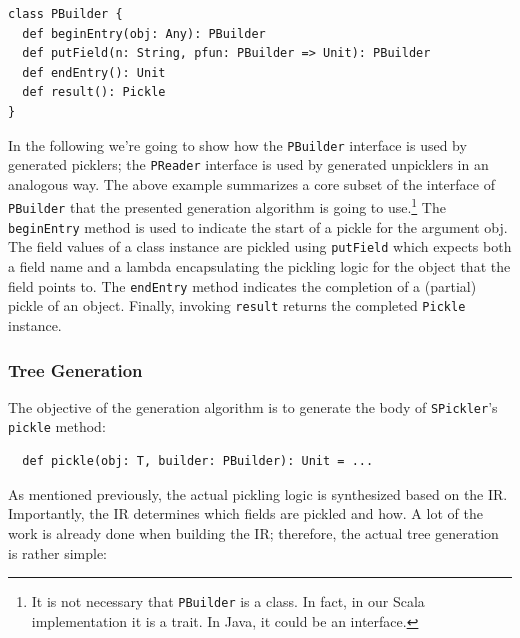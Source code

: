 \documentclass[10pt]{sigplanconf}
\theoremstyle{definition}
\theoremstyle{definition}
\newcommand{\term}[1]{\mbox{\texttt{#1}}}
\begin{document}
\begin{lstlisting}
class PBuilder {
  def beginEntry(obj: Any): PBuilder
  def putField(n: String, pfun: PBuilder => Unit): PBuilder
  def endEntry(): Unit
  def result(): Pickle
}
\end{lstlisting}

In the following we're going to show how the \verb|PBuilder| interface is used
by generated picklers; the \verb|PReader| interface is used by generated
unpicklers in an analogous way. The above example summarizes a core
subset of the interface of \verb|PBuilder| that the presented generation
algorithm is going to use.\footnote{It is not necessary that \texttt{PBuilder}
is a class. In fact, in our Scala implementation it is a trait. In Java, it
could be an interface.} The \verb|beginEntry| method is used to indicate the
start of a pickle for the argument obj. The field values of a class instance
are pickled using \verb|putField| which expects both a field name and a lambda
encapsulating the pickling logic for the object that the field points to. The
\verb|endEntry| method indicates the completion of a (partial) pickle of an
object. Finally, invoking \verb|result| returns the completed \verb|Pickle|
instance.

\subsubsection{Tree Generation}

The objective of the generation algorithm is to generate the body of
\term{SPickler}'s \term{pickle} method:

\begin{lstlisting}
  def pickle(obj: T, builder: PBuilder): Unit = ...
\end{lstlisting}

As mentioned previously, the actual pickling logic is synthesized based on the
IR. Importantly, the IR determines which fields are pickled and how. A lot of
the work is already done when building the IR; therefore, the actual tree
generation is rather simple:
\end{document}
